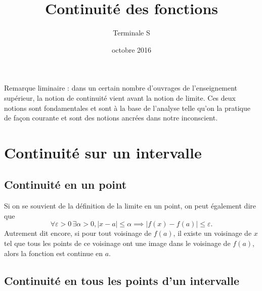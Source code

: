 \documentclass[12pt,a4paper]{article}
\title{Continuité des fonctions}
\author{Terminale S}
\date{octobre 2016}
\makeatletter
\renewcommand{\maketitle}%
{\framebox{%
    \begin{minipage}{1.0\linewidth}%
      \begin{center}%
        \Large \@title ~-- \@author \\%
        \@date%
      \end{center}%
    \end{minipage}}%
  \normalsize%
}
\newcommand{\abs}[1]{\left\lvert #1 \right\rvert}
\theoremstyle{break}
\newtheorem{definition}{Définition}
\theoremstyle{plain}
\theoremstyle{nonumberplain}
\theoremstyle{nonumberbreak}
\makeatother
\begin{document}
\maketitle

Remarque liminaire : dans un certain nombre d'ouvrages de l'enseignement
supérieur, la notion de continuité vient avant la notion de limite. Ces
deux notions sont fondamentales et sont à la base de l'analyse telle
qu'on la pratique de façon courante et sont des notions ancrées dans
notre inconscient.

\section{Continuité sur un intervalle}

\subsection{Continuité en un point}


Si on se souvient de la définition de la limite en un point, on peut
également dire que \[ \forall \varepsilon > 0\, \exists \alpha > 0,
\abs{x - a} \leq \alpha \implies \abs{f(x) - f(a)} \leq \varepsilon .\]
Autrement dit encore, si pour tout voisinage de $f(a)$, il existe un
voisinage de $x$ tel que tous les points de ce voisinage ont une image
dans le voisinage de $f(a)$, alors la fonction est continue en $a$.

\subsection{Continuité en tous les points d'un intervalle}

\end{document}
